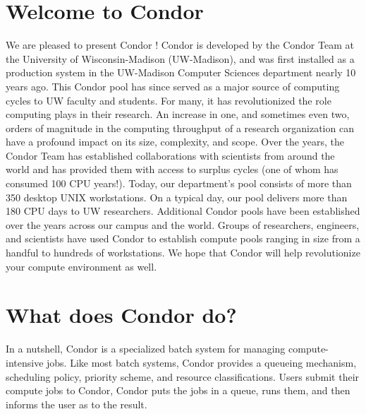 
\section{Welcome to Condor}  
%
% 
%

We are pleased to present Condor \VersionNotice! Condor is developed by
the Condor Team at the University of Wisconsin-Madison (UW-Madison), and
was first installed as a production system in the UW-Madison Computer
Sciences department nearly 10 years ago. This Condor pool has since
served as a major source of computing cycles to UW faculty and students.
For many, it has revolutionized the role computing plays in their
research. An increase in one, and sometimes even two, orders of
magnitude in the computing throughput of a research organization can
have a profound impact on its size, complexity, and scope. Over the
years, the Condor Team has established collaborations with scientists
from around the world and has provided them with access to surplus
cycles (one of whom has consumed 100 CPU years!). Today, our
department's pool consists of more than 350 desktop UNIX workstations.
On a typical day, our pool delivers more than 180 CPU days to UW
researchers. Additional Condor pools have been established over the
years across our campus and the world. Groups of researchers, engineers,
and scientists have used Condor to establish compute pools ranging in
size from a handful to hundreds of workstations. We hope that Condor
will help revolutionize your compute environment as well.


\section{What does Condor do?}


In a nutshell, Condor is a specialized batch system for managing
compute-intensive jobs.  Like most batch systems, Condor provides a
queueing mechanism, scheduling policy, priority scheme, and resource
classifications.  Users submit their compute jobs to Condor, Condor puts
the jobs in a queue, runs them, and then informs the user as to the
result.

